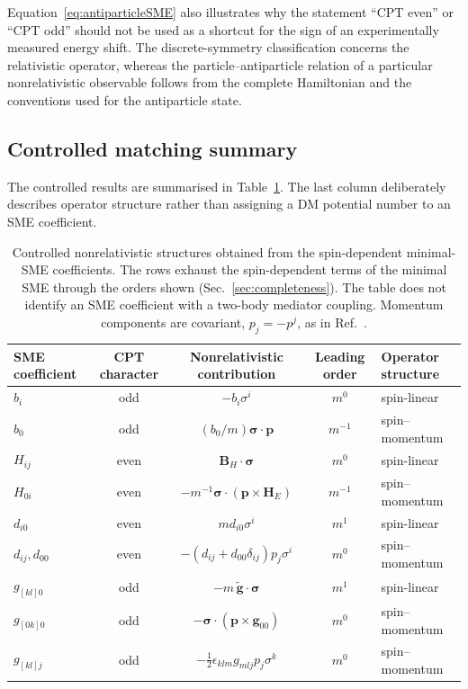 \documentclass[aps,prd,reprint,superscriptaddress,nofootinbib]{revtex4-2}
\begin{document}
	Equation~\eqref{eq:antiparticleSME} also illustrates why the statement
	``CPT even'' or ``CPT odd'' should not be used as a shortcut for the
	sign of an experimentally measured energy shift. The discrete-symmetry
	classification concerns the relativistic operator, whereas the
	particle--antiparticle relation of a particular nonrelativistic
	observable follows from the complete Hamiltonian and the conventions
	used for the antiparticle state.
	
	\subsection{Controlled matching summary}
	
	The controlled results are summarised in Table~\ref{tab:matching}.
	The last column deliberately describes operator structure rather than
	assigning a DM potential number to an SME coefficient.
	
	\begin{table}[t]
		\caption{Controlled nonrelativistic structures obtained from the spin-dependent minimal-SME coefficients. The rows exhaust the spin-dependent terms of the minimal SME through the orders shown (Sec.~\ref{sec:completeness}). The table does not identify an SME coefficient with a two-body mediator coupling. Momentum components are covariant, $p_j=-p^j$, as in Ref.~\cite{KosteleckyLane1999}.}
		\label{tab:matching}
		\begin{ruledtabular}
			\begin{tabular}{lcccl}
				SME coefficient & CPT character & Nonrelativistic contribution
				& Leading order & Operator structure\\
				\hline
				$b_i$
				& odd
				& $-b_i\sigma^i$
				& $m^0$
				& spin-linear
				\\
				$b_0$
				& odd
				& $(b_0/m)\boldsymbol{\sigma}\cdot\mathbf p$
				& $m^{-1}$
				& spin--momentum
				\\
				$H_{ij}$
				& even
				& $\mathbf B_H\cdot\boldsymbol{\sigma}$
				& $m^0$
				& spin-linear
				\\
				$H_{0i}$
				& even
				& $-m^{-1}\boldsymbol{\sigma}\cdot
				(\mathbf p\times\mathbf H_E)$
				& $m^{-1}$
				& spin--momentum
				\\
				$d_{i0}$
				& even
				& $m d_{i0}\sigma^i$
				& $m^1$
				& spin-linear
				\\
				$d_{ij},d_{00}$
				& even
				& $-(d_{ij}+d_{00}\delta_{ij})p_j\sigma^i$
				& $m^0$
				& spin--momentum
				\\
				$g_{[kl]0}$
				& odd
				& $-m\,\tilde{\mathbf g}\cdot\boldsymbol{\sigma}$
				& $m^1$
				& spin-linear
				\\
				$g_{[0k]0}$
				& odd
				& $-\boldsymbol{\sigma}\cdot(\mathbf p\times\mathbf g_{00})$
				& $m^0$
				& spin--momentum
				\\
				$g_{[kl]j}$
				& odd
				& $-\tfrac12\epsilon_{klm}g_{mlj}p_j\sigma^k$
				& $m^0$
				& spin--momentum
			\end{tabular}
		\end{ruledtabular}
	\end{table}
	
\end{document}
